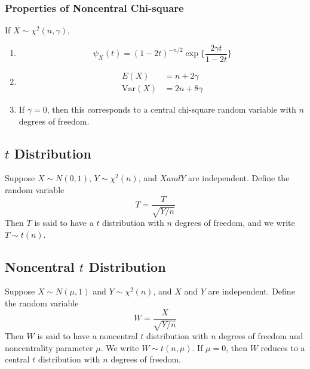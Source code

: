 \documentclass[12pt]{article}
\newcommand{\Var}{\mathrm{Var}}
\numberwithin{equation}{section}
\begin{document}
\subsubsection{Properties of Noncentral Chi-square}
If $X \sim \chi^2(n, \gamma)$,
\begin{enumerate}
  \item
    \begin{equation*}
      \psi_X(t) = (1 - 2t)^{-n/2} \exp\{ \frac{2 \gamma t}{1 - 2t} \}
     \end{equation*}
  \item
    \begin{align*}
      E(X) &= n + 2\gamma \\
      \Var(X) &= 2n + 8\gamma
    \end{align*}
  \item If $\gamma = 0$, then this corresponds to a central chi-square random variable with $n$ degrees of freedom.
\end{enumerate}

\subsection{$t$ Distribution}
Suppose $X \sim N(0, 1)$, $Y \sim \chi^2(n)$, and $X and Y$ are independent. Define the random variable
%
\begin{equation*}
  T = \frac{T}{\sqrt{Y / n}}
\end{equation*}
%
Then $T$ is said to have a $t$ distribution with $n$ degrees of freedom, and we write $T \sim t(n)$.

\subsection{Noncentral $t$ Distribution}
Suppose $X \sim N(\mu, 1)$ and $Y \sim \chi^2(n)$, and $X$ and $Y$ are independent. Define the random variable
%
\begin{equation*}
  W = \frac{X}{\sqrt{Y / n}}
\end{equation*}
Then $W$ is said to have a noncentral $t$ distribution with $n$ degrees of freedom and noncentrality parameter  $\mu$. We write $W \sim t(n, \mu)$. If $\mu = 0$, then $W$ reduces to a central $t$ distribution with $n$ degrees of freedom.
\end{document}
